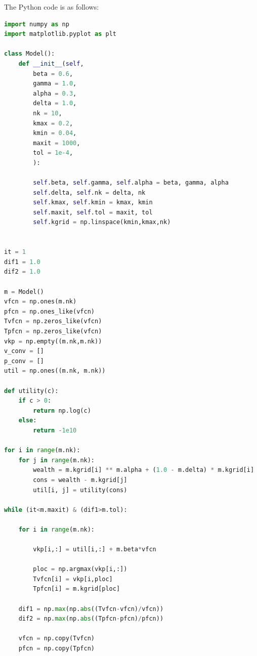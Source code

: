 \documentclass{ltjsarticle}
\begin{document}
The Python code is as follows:
\begin{lstlisting}[language=python,
    backgroundcolor=\color{backcolour},
    commentstyle=\color{codegreen},
    morekeywords={as},
    classoffset=0,
    keywordstyle=\color{codepurple},
    deletekeywords={list,in,float},
    classoffset=1,
    morekeywords={list},
    keywordstyle=\color{blue!60!green},
    classoffset=2,
    morekeywords={in},
    keywordstyle=\color{blue},
    classoffset=3,
    morekeywords={float},
    keywordstyle=\color{blue!40!green},
    numberstyle=\tiny\color{black},
    stringstyle=\color{codered},
    basicstyle=\ttfamily\footnotesize,
    breaklines=true,
    emph={len,range,print},
    emphstyle=\color{yellow!40!black}
    ]
import numpy as np
import matplotlib.pyplot as plt

class Model():
    def __init__(self,
        beta = 0.6,
        gamma = 1.0,
        alpha = 0.3,
        delta = 1.0,
        nk = 10,   
        kmax = 0.2,  
        kmin = 0.04, 
        maxit = 1000,
        tol = 1e-4,  
        ): 
        
        self.beta, self.gamma, self.alpha = beta, gamma, alpha 
        self.delta, self.nk = delta, nk 
        self.kmax, self.kmin = kmax, kmin 
        self.maxit, self.tol = maxit, tol
        self.kgrid = np.linspace(kmin,kmax,nk) 


it = 1
dif1 = 1.0 
dif2 = 1.0 

m = Model()
vfcn = np.ones(m.nk)
pfcn = np.ones_like(vfcn)
Tvfcn = np.zeros_like(vfcn)
Tpfcn = np.zeros_like(vfcn)
vkp = np.empty((m.nk,m.nk))
v_conv = [] 
p_conv = [] 
util = np.ones((m.nk, m.nk))

def utility(c):
    if c > 0:
        return np.log(c)
    else:
        return -1e10 

for i in range(m.nk): 
    for j in range(m.nk): 
        wealth = m.kgrid[i] ** m.alpha + (1.0 - m.delta) * m.kgrid[i]
        cons = wealth - m.kgrid[j]
        util[i, j] = utility(cons) 

while (it<m.maxit) & (dif1>m.tol):

    for i in range(m.nk):
        
        vkp[i,:] = util[i,:] + m.beta*vfcn
        
        ploc = np.argmax(vkp[i,:])
        Tvfcn[i] = vkp[i,ploc]
        Tpfcn[i] = m.kgrid[ploc]
    
    dif1 = np.max(np.abs((Tvfcn-vfcn)/vfcn))
    dif2 = np.max(np.abs((Tpfcn-pfcn)/pfcn)) 
    
    vfcn = np.copy(Tvfcn)
    pfcn = np.copy(Tpfcn)


\end{lstlisting}
\end{document}
